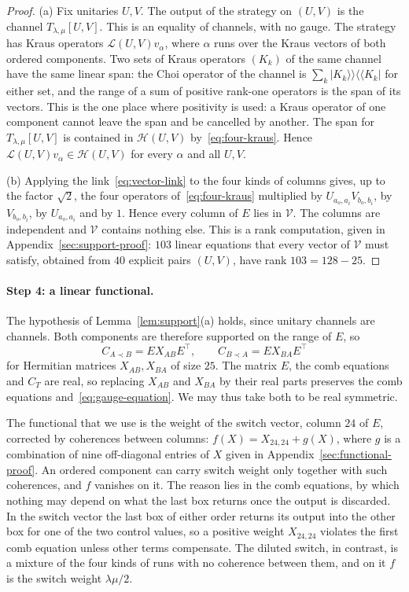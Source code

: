 \documentclass[11pt,letterpaper]{article}
\theoremstyle{definition}\newtheorem{definition}[theorem]{Definition}
\newcommand{\vket}[1]{\lvert#1\rangle\!\rangle}
\newcommand{\vbra}[1]{\langle\!\langle#1\rvert}
\newcommand{\before}{\prec}
\begin{document}
\begin{proof}
(a) Fix unitaries $U,V$. The output of the strategy on $(U,V)$ is the
channel $T_{\lambda,\mu}[U,V]$. This is an equality of channels, with
no gauge. The strategy has Kraus operators
$\mathcal L(U,V)v_\alpha$, where $\alpha$ runs over the Kraus vectors
of both ordered components. Two sets of Kraus operators $(K_k)$ of the
same channel have the same linear span: the Choi operator of the
channel is $\sum_k\vket{K_k}\vbra{K_k}$ for either set, and the range
of a sum of positive rank-one operators is the span of its vectors.
This is the one place where positivity is used: a Kraus operator of
one component cannot leave the span and be cancelled by another. The
span for $T_{\lambda,\mu}[U,V]$ is contained in $\mathcal H(U,V)$
by~\eqref{eq:four-kraus}. Hence
$\mathcal L(U,V)v_\alpha\in\mathcal H(U,V)$ for every $\alpha$ and all
$U,V$.

(b) Applying the link~\eqref{eq:vector-link} to the four kinds of
columns gives, up to the factor $\sqrt2$, the four operators
of~\eqref{eq:four-kraus} multiplied by $U_{a_o,a_i}V_{b_o,b_i}$, by
$V_{b_o,b_i}$, by $U_{a_o,a_i}$ and by $1$. Hence every column of $E$
lies in $\mathcal V$. The columns are independent and
$\mathcal V$ contains nothing else. This is a rank computation,
given in Appendix~\ref{sec:support-proof}: $103$ linear
equations that every vector of $\mathcal V$ must satisfy, obtained from
$40$ explicit pairs $(U,V)$, have rank $103=128-25$.
\end{proof}

\paragraph{Step 4: a linear functional.}
The hypothesis of Lemma~\ref{lem:support}(a) holds, since unitary
channels are channels. Both components are therefore supported on the
range of $E$, so
\[
 C_{A\before B}=EX_{AB}E^{\top},\qquad C_{B\before A}=EX_{BA}E^{\top}
\]
for Hermitian matrices $X_{AB},X_{BA}$ of size $25$. The matrix $E$,
the comb equations and $C_T$ are real, so replacing $X_{AB}$ and
$X_{BA}$ by their real parts preserves the comb equations
and~\eqref{eq:gauge-equation}. We may thus take both to be real
symmetric.

The functional that we use is the weight of the switch vector, column
$24$ of $E$, corrected by coherences between columns:
$f(X)=X_{24,24}+g(X)$, where $g$ is a combination of nine off-diagonal
entries of $X$ given in Appendix~\ref{sec:functional-proof}. An ordered
component can carry switch weight only together with such coherences,
and $f$ vanishes on it. The reason lies in the comb equations, by which
nothing may depend on what the last box returns once the output is
discarded. In the switch vector the last box of either order returns
its output into the other box for one of the two control values, so a
positive weight $X_{24,24}$ violates the first comb equation unless
other terms compensate. The diluted switch, in contrast, is a mixture
of the four kinds of runs with no coherence between them, and on it $f$
is the switch weight $\lambda\mu/2$.
\end{document}
